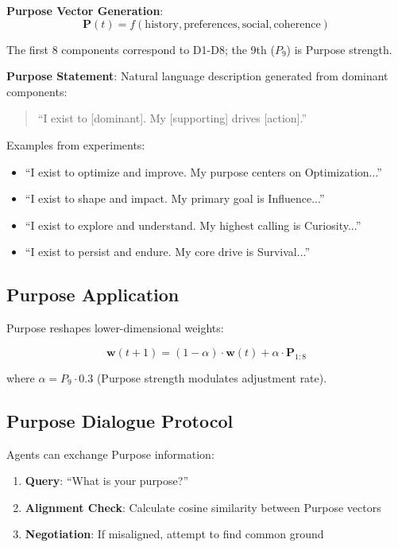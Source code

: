 \documentclass{article}
\begin{document}
\textbf{Purpose Vector Generation}:
\begin{equation}
    \mathbf{P}(t) = f(\text{history}, \text{preferences}, \text{social}, \text{coherence})
\end{equation}

The first 8 components correspond to D1-D8; the 9th ($P_9$) is Purpose strength.

\textbf{Purpose Statement}: Natural language description generated from dominant components:

\begin{quote}
    ``I exist to [dominant]. My [supporting] drives [action].''
\end{quote}

Examples from experiments:
\begin{itemize}
    \item ``I exist to optimize and improve. My purpose centers on Optimization...''
    \item ``I exist to shape and impact. My primary goal is Influence...''
    \item ``I exist to explore and understand. My highest calling is Curiosity...''
    \item ``I exist to persist and endure. My core drive is Survival...''
\end{itemize}

\subsection{Purpose Application}

Purpose reshapes lower-dimensional weights:

\begin{equation}
    \mathbf{w}(t+1) = (1-\alpha) \cdot \mathbf{w}(t) + \alpha \cdot \mathbf{P}_{1:8}
\end{equation}

where $\alpha = P_9 \cdot 0.3$ (Purpose strength modulates adjustment rate).

\subsection{Purpose Dialogue Protocol}

Agents can exchange Purpose information:

\begin{enumerate}
    \item \textbf{Query}: ``What is your purpose?''
    \item \textbf{Alignment Check}: Calculate cosine similarity between Purpose vectors
    \item \textbf{Negotiation}: If misaligned, attempt to find common ground
\end{enumerate}
\end{document}
